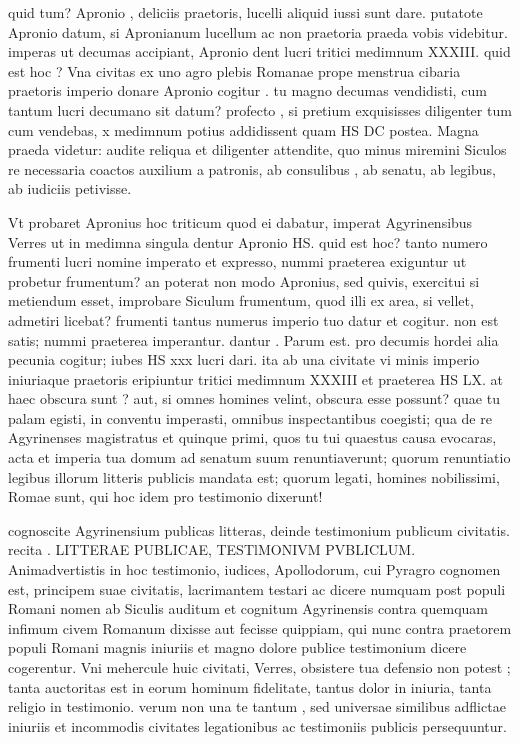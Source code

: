 quid tum? Apronio , deliciis praetoris, lucelli aliquid iussi sunt dare. putatote Apronio datum, si Apronianum lucellum ac non praetoria praeda vobis videbitur. imperas ut decumas accipiant, Apronio dent lucri tritici medimnum XXXIII. quid est hoc ? Vna civitas ex uno agro plebis Romanae prope menstrua cibaria praetoris imperio donare Apronio cogitur . tu magno decumas vendidisti, cum tantum lucri decumano sit datum? profecto , si pretium exquisisses diligenter tum cum vendebas, x medimnum potius addidissent quam HS DC postea. Magna praeda videtur: audite reliqua et diligenter attendite, quo minus miremini Siculos re necessaria coactos auxilium a patronis, ab consulibus , ab senatu, ab legibus, ab iudiciis petivisse.

 Vt probaret Apronius hoc triticum quod ei dabatur, imperat Agyrinensibus Verres ut in medimna singula dentur Apronio HS. quid est hoc? tanto numero frumenti lucri nomine imperato et expresso, nummi praeterea exiguntur ut probetur frumentum? an poterat non modo Apronius, sed quivis, exercitui si metiendum esset, improbare Siculum frumentum, quod illi ex area, si vellet, admetiri licebat? frumenti tantus numerus imperio tuo datur et cogitur. non est satis; nummi praeterea imperantur. dantur . Parum est. pro decumis hordei alia pecunia cogitur; iubes HS xxx lucri dari. ita ab una civitate vi minis imperio iniuriaque praetoris eripiuntur tritici medimnum XXXIII et praeterea HS LX. at haec obscura sunt ? aut, si omnes homines velint, obscura esse possunt? quae tu palam egisti, in conventu imperasti, omnibus inspectantibus coegisti; qua de re Agyrinenses magistratus et quinque primi, quos tu tui quaestus causa evocaras, acta et imperia tua domum ad senatum suum renuntiaverunt; quorum renuntiatio legibus illorum litteris publicis mandata est; quorum legati, homines nobilissimi, Romae sunt, qui hoc idem pro testimonio dixerunt!

 cognoscite Agyrinensium publicas litteras, deinde testimonium publicum civitatis. recita . LITTERAE PUBLICAE, TESTlMONIVM PVBLICLUM. Animadvertistis in hoc testimonio, iudices, Apollodorum, cui Pyragro cognomen est, principem suae civitatis, lacrimantem testari ac dicere numquam post populi Romani nomen ab Siculis auditum et cognitum Agyrinensis contra quemquam infimum civem Romanum dixisse aut fecisse quippiam, qui nunc contra praetorem populi Romani magnis iniuriis et magno dolore publice testimonium dicere cogerentur. Vni mehercule huic civitati, Verres, obsistere tua defensio non potest ; tanta auctoritas est in eorum hominum fidelitate, tantus dolor in iniuria, tanta religio in testimonio. verum non una te tantum , sed universae similibus adflictae iniuriis et incommodis civitates legationibus ac testimoniis publicis persequuntur.

